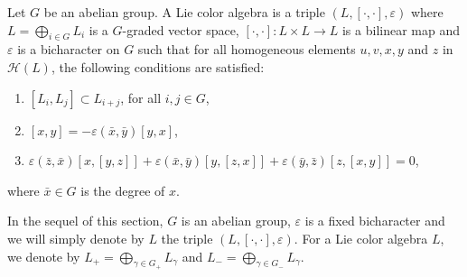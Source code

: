 \documentclass[11pt, twoside]{article}
\begin{document}
\begin{defi}
    Let $G$ be an abelian group. A Lie color algebra is a triple $(L,[\cdot,\cdot],\varepsilon) $ where $L= \bigoplus\limits_{i\in G} L_i $ is a $G$-graded vector space, $[\cdot,\cdot]:L\times L\to L $ is a bilinear map and $\varepsilon $ is a bicharacter on $G$ such that for all homogeneous elements $u,v,x,y$ and $z$ in $\mathcal{H}(L)$, the following conditions are satisfied: \begin{enumerate}
        \item $[L_i,L_j]\subset L_{i+j} $, for all $i,j \in G$,
        \item  $[x,y]= -\varepsilon(\bar{x},\bar{y})[y,x] $,
        \item  $\varepsilon(\bar{z},\bar{x})[x,[y,z]]+ \varepsilon(\bar{x},\bar{y})[y,[z,x]]+ \varepsilon(\bar{y},\bar{z})[z,[x,y]]=0 $,
        
    \end{enumerate} where $\bar{x}\in G $ is the degree of $x$. 
    \end{defi}
    In the sequel of this section, $G$ is an abelian group, $\varepsilon$ is a fixed bicharacter and we will simply denote by $L$ the triple $(L,[\cdot,\cdot], \varepsilon) $.
For a Lie color algebra $L$, we denote by $L_+=\bigoplus\limits_{\gamma\in G_+}L_{\gamma} $ and $L_-=\bigoplus\limits_{\gamma\in G_-}L_{\gamma} $.
\end{document}
